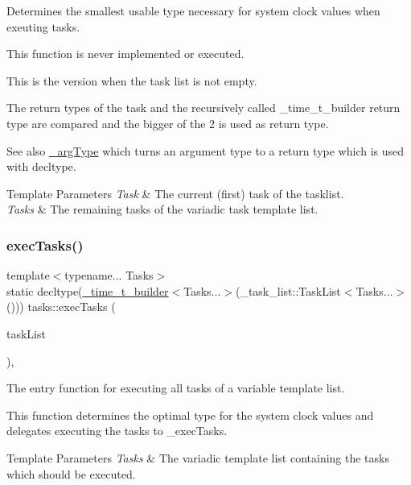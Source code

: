Determines the smallest usable type necessary for system clock values when exeuting tasks. 

This function is never implemented or executed.

This is the version when the task list is not empty.

The return types of the task and the recursively called \+\_\+time\+\_\+t\+\_\+builder return type are compared and the bigger of the 2 is used as return type.

\begin{DoxySeeAlso}{See also}
\hyperlink{namespacetasks_ac4a797a86584958bef0b67616a38c8ae}{\+\_\+arg\+Type} which turns an argument type to a return type which is used with decltype.
\end{DoxySeeAlso}

\begin{DoxyTemplParams}{Template Parameters}
{\em Task} & The current (first) task of the tasklist. \\
\hline
{\em Tasks} & The remaining tasks of the variadic task template list. \\
\hline
\end{DoxyTemplParams}
\hypertarget{namespacetasks_a6590d6a524b4aedb5d0dfef5e1b61bc1}{}\label{namespacetasks_a6590d6a524b4aedb5d0dfef5e1b61bc1} 
\subsubsection{\texorpdfstring{exec\+Tasks()}{execTasks()}}
{\footnotesize\ttfamily template$<$typename... Tasks$>$ \\
static decltype(\hyperlink{namespacetasks_a9469b8fb917e0f3ec0168293ac046a4c}{\+\_\+time\+\_\+t\+\_\+builder}$<$Tasks...$>$(\+\_\+task\+\_\+list\+::\+Task\+List$<$Tasks...$>$())) tasks\+::exec\+Tasks (\begin{DoxyParamCaption}\item[{const \+\_\+task\+\_\+list\+::\+Task\+List$<$ Tasks... $>$ \&}]{task\+List }\end{DoxyParamCaption})\hspace{0.3cm}{\ttfamily [inline]}, {\ttfamily [static]}}



The entry function for executing all tasks of a variable template list. 

This function determines the optimal type for the system clock values and delegates executing the tasks to \+\_\+exec\+Tasks.


\begin{DoxyTemplParams}{Template Parameters}
{\em Tasks} & The variadic template list containing the tasks which should be executed. \\
\hline
\end{DoxyTemplParams}
